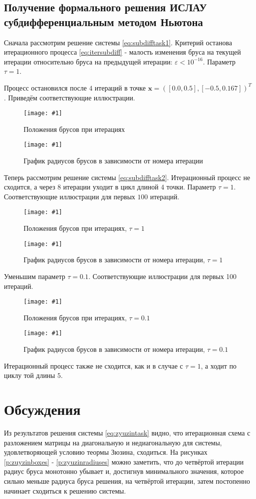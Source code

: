 \documentclass[a4paper,12pt]{article}
\newcommand{\plot}[3]{
    \begin{figure}[H]
        \texttt{[image: \#1]}
        \caption{#2}
        \label{#3}
    \end{figure}
}
\begin{document}
    \subsection{Получение формального решения ИСЛАУ субдифференциальным методом Ньютона}
    Сначала рассмотрим решение системы \ref{eq:subdifftask1}. \newline
    Критерий останова итерационного процесса \ref{eq:itersubdiff} - малость изменения бруса на текущей итерации относительно бруса на предыдущей итерации: $ \varepsilon < 10^{-16} $.
    Параметр $ \tau = 1 $.

    \noindent Процесс остановился после $ 4 $ итераций в точке $ \textbf{x} = ([0.0, 0.5], [-0.5, 0.167])^{T} $. \newline
    Приведём соответствующие иллюстрации.
    \plot{SubdifferentialNewtonTask1Boxes}{Положения брусов при итерациях}{p:subdifftask1boxes}
    \plot{SubdifferentialNewtonTask1Radiuses}{График радиусов брусов в зависимости от номера итерации}{p:subdifftask2radiuses}

    \noindent
    Теперь рассмотрим решение системы \ref{eq:subdifftask2}. \newline
    Итерационный процесс не сходится, а через $ 8 $ итерации уходит в цикл длиной $ 4 $ точки. 
    Параметр $ \tau = 1 $.
    Соответствующие иллюстрации для первых $ 100 $ итераций.
    \plot{SubdifferentialNewtonTask2Tau1Boxes}{Положения брусов при итерациях, $ \tau = 1 $}{p:subdifftask2tau1boxes}
    \plot{SubdifferentialNewtonTask2Tau1Radiuses}{График радиусов брусов в зависимости от номера итерации, $ \tau = 1 $}{p:subdifftask2tau1radiuses}

    \noindent
    Уменьшим параметр $ \tau = 0.1 $.
    Соответствующие иллюстрации для первых 100 итераций.
    \plot{SubdifferentialNewtonTask2Tau01Boxes}{Положения брусов при итерациях, $ \tau = 0.1 $}{p:subdifftask2tau01boxes}
    \plot{SubdifferentialNewtonTask2Tau01Radiuses}{График радиусов брусов в зависимости от номера итерации, $ \tau = 0.1 $}{p:subdifftask2tau01radiuses}
    Итерационный процесс также не сходится, как и в случае с $ \tau = 1 $, а ходит по циклу той длины $ 5 $.

    \section{Обсуждения}
    Из результатов решения системы \ref{eq:zyuzintask} видно, что итерационная схема с разложением матрицы на диагональную и недиагональную для системы, удовлетворяющей условию теормы Зюзина, сходиться.
    На рисунках \ref{p:zuyzinboxes} - \ref{p:zyuzinradiuses} можно заметить, что до четвёртой итерации радиус бруса монотонно убывает и, достигнув минимального значения, 
    которое сильно меньше радиуса бруса решения, на четвёртой итерации, затем постопенно начинает сходиться к решению системы. \newline
\end{document}
